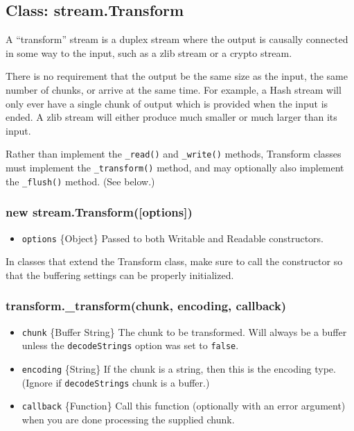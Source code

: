 \subsection{Class: stream.Transform}

A ``transform'' stream is a duplex stream where the output is causally
connected in some way to the input, such as a zlib stream or a crypto
stream.

There is no requirement that the output be the same size as the input,
the same number of chunks, or arrive at the same time. For example, a
Hash stream will only ever have a single chunk of output which is
provided when the input is ended. A zlib stream will either produce much
smaller or much larger than its input.

Rather than implement the \texttt{\_read()} and \texttt{\_write()}
methods, Transform classes must implement the \texttt{\_transform()}
method, and may optionally also implement the \texttt{\_flush()} method.
(See below.)

\subsubsection{new stream.Transform({[}options{]})}

\begin{itemize}
\item
  \texttt{options} \{Object\} Passed to both Writable and Readable
  constructors.
\end{itemize}

In classes that extend the Transform class, make sure to call the
constructor so that the buffering settings can be properly initialized.

\subsubsection{transform.\_transform(chunk, encoding, callback)}

\begin{itemize}
\item
  \texttt{chunk} \{Buffer \textbar{} String\} The chunk to be
  transformed. Will always be a buffer unless the \texttt{decodeStrings}
  option was set to \texttt{false}.
\item
  \texttt{encoding} \{String\} If the chunk is a string, then this is
  the encoding type. (Ignore if \texttt{decodeStrings} chunk is a
  buffer.)
\item
  \texttt{callback} \{Function\} Call this function (optionally with an
  error argument) when you are done processing the supplied chunk.
\end{itemize}

